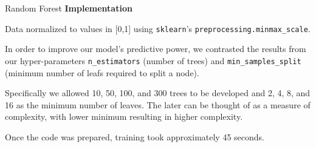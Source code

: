 \documentclass[titlepage,leqno]{beamer}%
\begin{document}
\begin{frame}[fragile]{Random Forest}
\small
\textbf{Implementation}

Data normalized to values in [0,1] using \verb+sklearn+'s \verb+preprocessing.minmax_scale+. 

\vspace{3.75mm}

In order to improve our model's predictive power, we contrasted the results from our hyper-parameters \verb+n_estimators+ (number of trees) and  \verb+min_samples_split+ (minimum number of leafs required to split a node). 

\vspace{3.75mm}

Specifically we allowed 10, 50, 100, and 300 trees to be developed and 2, 4, 8, and 16 as the minimum number of leaves. The later can be thought of as a measure of complexity, with lower minimum resulting in higher complexity. 

\vspace{3.75mm}

Once the code was prepared, training took approximately 45 seconds. 

\end{frame}
\end{document}
